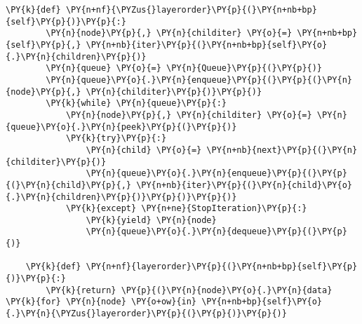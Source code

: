 \begin{Verbatim}[commandchars=\\\{\}]
    \PY{k}{def} \PY{n+nf}{\PYZus{}layerorder}\PY{p}{(}\PY{n+nb+bp}{self}\PY{p}{)}\PY{p}{:}
        \PY{n}{node}\PY{p}{,} \PY{n}{childiter} \PY{o}{=} \PY{n+nb+bp}{self}\PY{p}{,} \PY{n+nb}{iter}\PY{p}{(}\PY{n+nb+bp}{self}\PY{o}{.}\PY{n}{children}\PY{p}{)}
        \PY{n}{queue} \PY{o}{=} \PY{n}{Queue}\PY{p}{(}\PY{p}{)}
        \PY{n}{queue}\PY{o}{.}\PY{n}{enqueue}\PY{p}{(}\PY{p}{(}\PY{n}{node}\PY{p}{,} \PY{n}{childiter}\PY{p}{)}\PY{p}{)}
        \PY{k}{while} \PY{n}{queue}\PY{p}{:}
            \PY{n}{node}\PY{p}{,} \PY{n}{childiter} \PY{o}{=} \PY{n}{queue}\PY{o}{.}\PY{n}{peek}\PY{p}{(}\PY{p}{)}
            \PY{k}{try}\PY{p}{:}
                \PY{n}{child} \PY{o}{=} \PY{n+nb}{next}\PY{p}{(}\PY{n}{childiter}\PY{p}{)}
                \PY{n}{queue}\PY{o}{.}\PY{n}{enqueue}\PY{p}{(}\PY{p}{(}\PY{n}{child}\PY{p}{,} \PY{n+nb}{iter}\PY{p}{(}\PY{n}{child}\PY{o}{.}\PY{n}{children}\PY{p}{)}\PY{p}{)}\PY{p}{)}
            \PY{k}{except} \PY{n+ne}{StopIteration}\PY{p}{:}
                \PY{k}{yield} \PY{n}{node}
                \PY{n}{queue}\PY{o}{.}\PY{n}{dequeue}\PY{p}{(}\PY{p}{)}                 

    \PY{k}{def} \PY{n+nf}{layerorder}\PY{p}{(}\PY{n+nb+bp}{self}\PY{p}{)}\PY{p}{:}
        \PY{k}{return} \PY{p}{(}\PY{n}{node}\PY{o}{.}\PY{n}{data} \PY{k}{for} \PY{n}{node} \PY{o+ow}{in} \PY{n+nb+bp}{self}\PY{o}{.}\PY{n}{\PYZus{}layerorder}\PY{p}{(}\PY{p}{)}\PY{p}{)}
\end{Verbatim}
